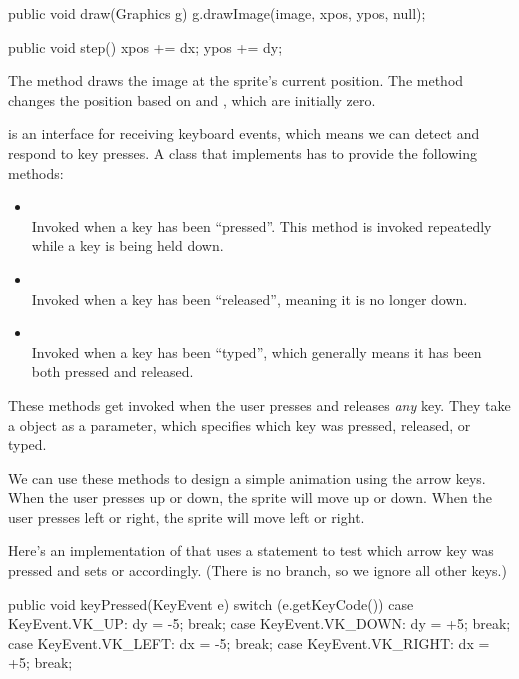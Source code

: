 \begin{code}
    public void draw(Graphics g) {
        g.drawImage(image, xpos, ypos, null);
    }

    public void step() {
        xpos += dx;
        ypos += dy;
    }
\end{code}

The  method draws the image at the sprite's current position.
The  method changes the position based on  and , which are initially zero.

 is an interface for receiving keyboard events, which means we can detect and respond to key presses.
A class that implements  has to provide the following methods:

\begin{itemize}

\item {}
\\ Invoked when a key has been ``pressed''.
This method is invoked repeatedly while a key is being held down.

\item {}
\\ Invoked when a key has been ``released'', meaning it is no longer down.

\item {}
\\ Invoked when a key has been ``typed'', which generally means it has been both pressed and released.

\end{itemize}

These methods get invoked when the user presses and releases {\em any} key.
They take a  object as a parameter, which specifies which key was pressed, released, or typed.

We can use these methods to design a simple animation using the arrow keys.
When the user presses up or down, the sprite will move up or down.
When the user presses left or right, the sprite will move left or right.

Here's an implementation of  that uses a  statement to test which arrow key was pressed and sets  or  accordingly.
(There is no  branch, so we ignore all other keys.)

\begin{code}
public void keyPressed(KeyEvent e) {
    switch (e.getKeyCode()) {
        case KeyEvent.VK_UP:
            dy = -5;
            break;
        case KeyEvent.VK_DOWN:
            dy = +5;
            break;
        case KeyEvent.VK_LEFT:
            dx = -5;
            break;
        case KeyEvent.VK_RIGHT:
            dx = +5;
            break;
    }
}
\end{code}

